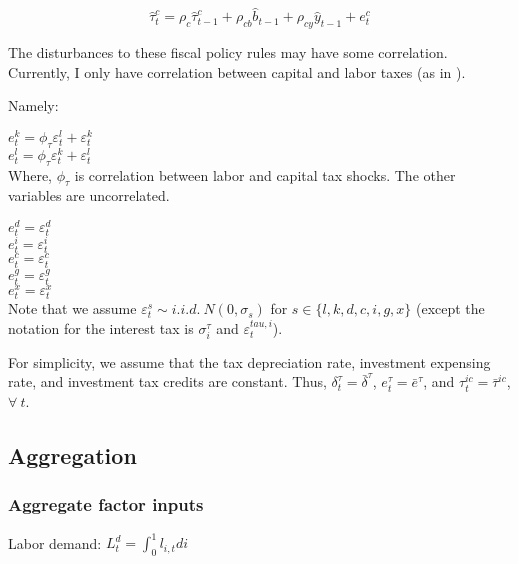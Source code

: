 \documentclass[article,11pt,letterpaper,fleqn]{article}
\theoremstyle{definition}
\numberwithin{equation}{section}
\newcommand{\cn}{\citeasnoun} %
\begin{document}
\begin{equation}\label{consumption_tax}
\hat{\tau}^{c}_{t} = \rho_{c}\hat{\tau}^{c}_{t-1} +  \rho_{cb}\hat{b}_{t-1} + \rho_{cy}\hat{y}_{t-1} + e^{c}_{t}  
\end{equation}

The disturbances to these fiscal policy rules may have some correlation.  Currently, I only have correlation between capital and labor taxes (as in \cn{Zubairy2010}).

Namely:

$e^{k}_{t} = \phi_{\tau}\varepsilon^{l}_{t} + \varepsilon^{k}_{t}$\\

$e^{l}_{t} = \phi_{\tau}\varepsilon^{k}_{t} + \varepsilon^{l}_{t} $\\

Where, $\phi_{\tau}$ is correlation between labor and capital tax shocks.  The other variables are uncorrelated.

$e^{d}_{t} = \varepsilon^{d}_{t}$\\

$e^{i}_{t} = \varepsilon^{i}_{t}$\\

$e^{c}_{t} = \varepsilon^{c}_{t}$\\

$e^{g}_{t} = \varepsilon^{g}_{t}$\\

$e^{x}_{t} = \varepsilon^{x}_{t}$\\

Note that we assume $\varepsilon^{s}_{t} \sim i.i.d. \ N(0,\sigma_{s})$ for $s\in\{l, k, d, c, i, g, x\}$ (except the notation for the interest tax is $\sigma^{\tau}_{i}$ and $\varepsilon^{tau,i}_{t}$).

For simplicity, we assume that the tax depreciation rate, investment expensing rate, and investment tax credits are constant.  Thus, $\delta^{\tau}_{t}=\bar{\delta}^{\tau}$, $e^{\tau}_{t}=\bar{e}^{\tau}$, and $\tau^{ic}_{t}=\bar{\tau}^{ic}$, $\forall \ t$.

\subsection{Aggregation}


\subsubsection{Aggregate factor inputs}
Labor demand:
$L^{d}_{t} = \int_{0}^{1}l_{i,t}di $
\end{document}
